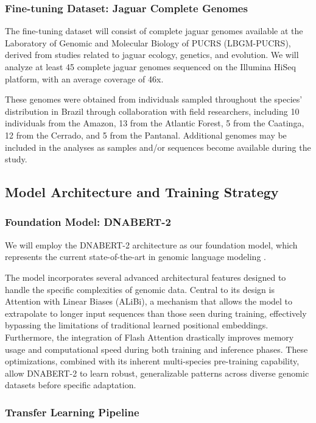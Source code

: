 \subsubsection{Fine-tuning Dataset: Jaguar Complete Genomes}

The fine-tuning dataset will consist of complete jaguar genomes available at the Laboratory of Genomic and Molecular Biology of PUCRS (LBGM-PUCRS), derived from studies related to jaguar ecology, genetics, and evolution. We will analyze at least 45 complete jaguar genomes sequenced on the Illumina HiSeq platform, with an average coverage of 46x.

These genomes were obtained from individuals sampled throughout the species' distribution in Brazil through collaboration with field researchers, including 10 individuals from the Amazon, 13 from the Atlantic Forest, 5 from the Caatinga, 12 from the Cerrado, and 5 from the Pantanal. Additional genomes may be included in the analyses as samples and/or sequences become available during the study.

\subsection{Model Architecture and Training Strategy}

\subsubsection{Foundation Model: DNABERT-2}

We will employ the DNABERT-2 architecture as our foundation model, which represents the current state-of-the-art in genomic language modeling \cite{zhou2024dnabert}.

The model incorporates several advanced architectural features designed to handle the specific complexities of genomic data. Central to its design is Attention with Linear Biases (ALiBi), a mechanism that allows the model to extrapolate to longer input sequences than those seen during training, effectively bypassing the limitations of traditional learned positional embeddings. Furthermore, the integration of Flash Attention drastically improves memory usage and computational speed during both training and inference phases. These optimizations, combined with its inherent multi-species pre-training capability, allow DNABERT-2 to learn robust, generalizable patterns across diverse genomic datasets before specific adaptation.

\subsubsection{Transfer Learning Pipeline}

